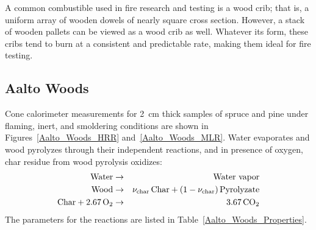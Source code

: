 A common combustible used in fire research and testing is a wood crib; that is, a uniform array of wooden dowels of nearly square cross section. However, a stack of wooden pallets can be viewed as a wood crib as well. Whatever its form, these cribs tend to burn at a consistent and predictable rate, making them ideal for fire testing.

\newpage

\subsection{Aalto Woods}
\label{Aalto_Woods_HRRPUA}

Cone calorimeter measurements for 2~cm thick samples of spruce and pine under flaming, inert, and smoldering conditions are shown in Figures~\ref{Aalto_Woods_HRR} and~\ref{Aalto_Woods_MLR}. Water evaporates and wood pyrolyzes through their independent reactions, and in presence of oxygen, char residue from wood pyrolysis oxidizes:
\begin{eqnarray}
   \hbox{Water} &\to& \hbox{Water vapor} \\
   \hbox{Wood} &\to& \nu_{\rm char} \, \hbox{Char} + (1-\nu_{\rm char}) \, \hbox{Pyrolyzate} \\
   \hbox{Char} + 2.67 \, \hbox{O}_2 &\to& 3.67 \, \hbox{CO}_2
\end{eqnarray}
The parameters for the reactions are listed in Table~\ref{Aalto_Woods_Properties}.


